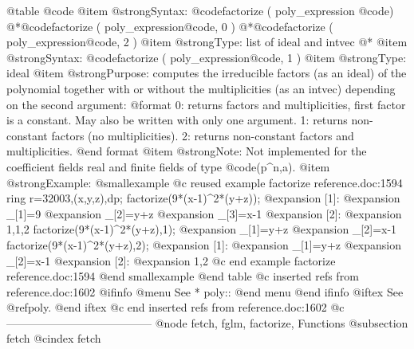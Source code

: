 @table @code
@item @strong{Syntax:}
@code{factorize (} poly_expression @code{)}
@*@code{factorize (} poly_expression@code{, 0 )}
@*@code{factorize (} poly_expression@code{, 2 )}
@item @strong{Type:}
list of ideal and intvec
@*
@item @strong{Syntax:}
@code{factorize (} poly_expression@code{, 1 )}
@item @strong{Type:}
ideal
@item @strong{Purpose:}
computes the irreducible factors (as an ideal) of the polynomial
together with or without
the multiplicities (as an intvec) depending on the second argument:
@format
    0: returns factors and multiplicities, first factor is a constant.
       May also be written with only one argument.
    1: returns non-constant factors (no multiplicities).
    2: returns non-constant factors and multiplicities.
@end format
@item @strong{Note:}
Not implemented for the coefficient fields real and finite fields of
type @code{(p^n,a)}.
@item @strong{Example:}
@smallexample
@c reused example factorize reference.doc:1594 
  ring r=32003,(x,y,z),dp;
  factorize(9*(x-1)^2*(y+z));
@expansion{} [1]:
@expansion{}    _[1]=9
@expansion{}    _[2]=y+z
@expansion{}    _[3]=x-1
@expansion{} [2]:
@expansion{}    1,1,2
  factorize(9*(x-1)^2*(y+z),1);
@expansion{} _[1]=y+z
@expansion{} _[2]=x-1
  factorize(9*(x-1)^2*(y+z),2);
@expansion{} [1]:
@expansion{}    _[1]=y+z
@expansion{}    _[2]=x-1
@expansion{} [2]:
@expansion{}    1,2
@c end example factorize reference.doc:1594
@end smallexample
@end table
@c inserted refs from reference.doc:1602
@ifinfo
@menu
See
* poly::
@end menu
@end ifinfo
@iftex
See
@ref{poly}.
@end iftex
@c end inserted refs from reference.doc:1602
@c ---------------------------------------
@node fetch, fglm, factorize, Functions
@subsection fetch
@cindex fetch

